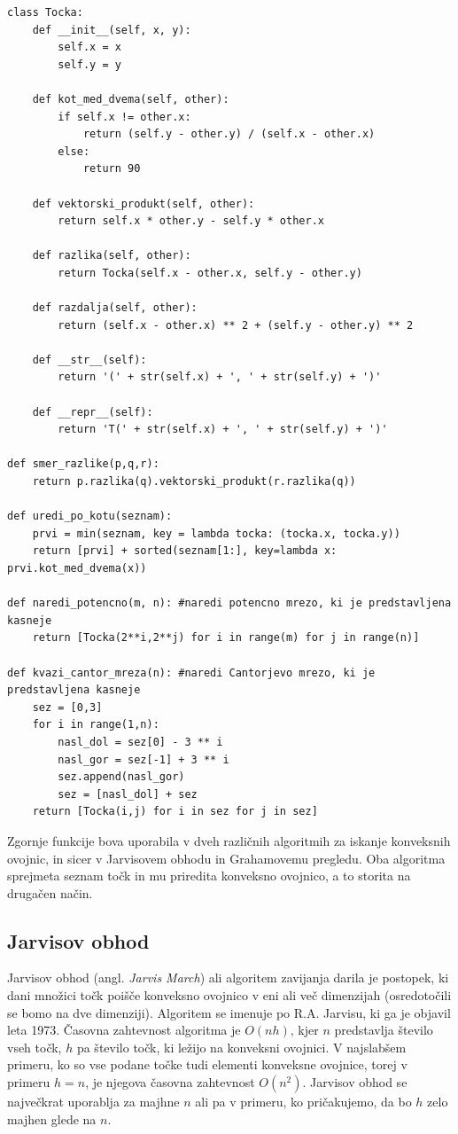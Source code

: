 \documentclass[a4paper]{article}
\begin{document}
\begin{lstlisting}
class Tocka:
    def __init__(self, x, y):
        self.x = x
        self.y = y

    def kot_med_dvema(self, other):
        if self.x != other.x:
            return (self.y - other.y) / (self.x - other.x)
        else:
            return 90

    def vektorski_produkt(self, other):
        return self.x * other.y - self.y * other.x

    def razlika(self, other):
    	return Tocka(self.x - other.x, self.y - other.y)
    
    def razdalja(self, other):
        return (self.x - other.x) ** 2 + (self.y - other.y) ** 2

    def __str__(self):
        return '(' + str(self.x) + ', ' + str(self.y) + ')'

    def __repr__(self):
        return 'T(' + str(self.x) + ', ' + str(self.y) + ')'

def smer_razlike(p,q,r):
    return p.razlika(q).vektorski_produkt(r.razlika(q))

def uredi_po_kotu(seznam):
    prvi = min(seznam, key = lambda tocka: (tocka.x, tocka.y))
    return [prvi] + sorted(seznam[1:], key=lambda x: prvi.kot_med_dvema(x))

def naredi_potencno(m, n): #naredi potencno mrezo, ki je predstavljena kasneje
    return [Tocka(2**i,2**j) for i in range(m) for j in range(n)]

def kvazi_cantor_mreza(n): #naredi Cantorjevo mrezo, ki je predstavljena kasneje
    sez = [0,3]
    for i in range(1,n):
        nasl_dol = sez[0] - 3 ** i
        nasl_gor = sez[-1] + 3 ** i
        sez.append(nasl_gor)
        sez = [nasl_dol] + sez
    return [Tocka(i,j) for i in sez for j in sez]
\end{lstlisting}

Zgornje funkcije bova uporabila v dveh različnih algoritmih za iskanje konveksnih ovojnic, in sicer v Jarvisovem obhodu in Grahamovemu pregledu.
Oba algoritma sprejmeta seznam točk in mu priredita konveksno ovojnico, a to storita na drugačen način.

\newpage
\subsection{Jarvisov obhod}
Jarvisov obhod (angl. \textit{Jarvis March}) ali algoritem zavijanja darila je postopek, ki dani množici točk poišče konveksno ovojnico v eni ali več dimenzijah (osredotočili se 
bomo na dve dimenziji). Algoritem se imenuje po R.A. Jarvisu, ki ga je objavil leta 1973. Časovna zahtevnost algoritma je $O(nh)$, kjer $n$ predstavlja število vseh točk, $h$ pa 
število točk, ki ležijo na konveksni ovojnici. V najslabšem primeru, ko so vse podane točke tudi elementi konveksne ovojnice, torej v primeru $h = n$, je njegova časovna zahtevnost 
$O(n^2)$. Jarvisov obhod se največkrat uporablja za majhne $n$ ali pa v primeru, ko pričakujemo, da bo $h$ zelo majhen glede na $n$.
\end{document}
